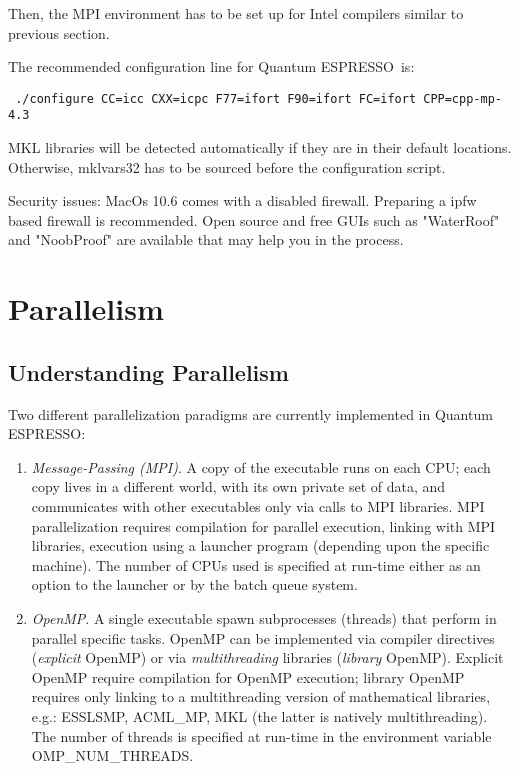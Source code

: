\documentclass[12pt,a4paper]{article}
\def\qe{{\sc Quantum ESPRESSO}}
\begin{document}
Then, the MPI environment has to be set up for Intel compilers similar to previous 
section. 

The recommended configuration line for \qe\ is: 
\begin{verbatim}
 ./configure CC=icc CXX=icpc F77=ifort F90=ifort FC=ifort CPP=cpp-mp-4.3
\end{verbatim}
MKL libraries will be detected automatically if they are in their default locations. 
Otherwise, mklvars32 has to be sourced before the configuration script. 

Security issues: 
MacOs 10.6 comes with a disabled firewall. Preparing a ipfw based firewall is recommended. 
Open source and free GUIs such as "WaterRoof" and "NoobProof" are available that may help 
you in the process.

\newpage

\section{Parallelism}
\label{Sec:para}

\subsection{Understanding Parallelism}

Two different parallelization paradigms are currently implemented 
in \qe:
\begin{enumerate}
\item {\em Message-Passing (MPI)}. A copy of the executable runs 
on each CPU; each copy lives in a different world, with its own
private set of data, and communicates with other executables only
via calls to MPI libraries. MPI parallelization requires compilation 
for parallel execution, linking with MPI libraries, execution using 
a launcher program (depending upon the specific machine). The number of CPUs used
is specified at run-time either as an option to the launcher or
by the batch queue system. 
\item {\em OpenMP}.  A single executable spawn subprocesses
(threads) that perform in parallel specific tasks. 
OpenMP can be implemented via compiler directives ({\em explicit} 
OpenMP) or via {\em multithreading} libraries  ({\em library} OpenMP).
Explicit OpenMP require compilation for OpenMP execution;
library OpenMP requires only linking to a multithreading
version of mathematical libraries, e.g.:
ESSLSMP, ACML\_MP, MKL (the latter is natively multithreading).
The number of threads is specified at run-time in the environment 
variable OMP\_NUM\_THREADS. 
\end{enumerate}
\end{document}
